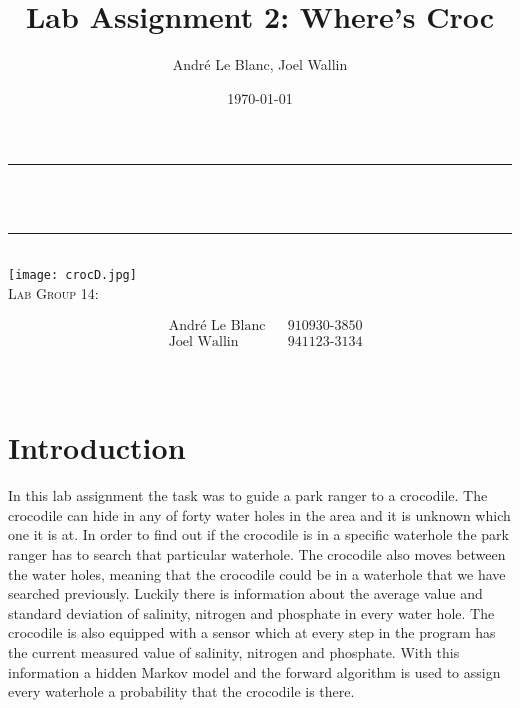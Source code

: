 \documentclass[12pt, a4paper]{article}
\title{Lab Assignment 2: Where’s Croc}	%
\author{André Le Blanc, Joel Wallin}
\date{\today}
\makeatletter
\let\thetitle\@title
\makeatother
\begin{document}
\begin{titlepage}
	\centering
    \vspace*{0.5 cm}
	\rule{\linewidth}{0.2 mm} \\[0.4 cm]
	{ \huge \bfseries \thetitle}\\  
	\rule{\linewidth}{0.2 mm} \\[1.5 cm]
    \texttt{[image: crocD.jpg]}\\[0.5 cm]
    
    \textsc{\Large Lab Group 14:}\\[0.5 cm]
	\begin{minipage}{0.4\textwidth}  
    \begin{align*}
	&\text{André Le Blanc}    &&\text{910930-3850}\\
	&\text{Joel Wallin}  &&\text{941123-3134}\\
	\end{align*}
	\end{minipage}\\[2 cm]
\end{titlepage}


\newpage
\tableofcontents
\newpage

\section{Introduction}

In this lab assignment the task was to guide a park ranger to a crocodile. The crocodile can hide in any of forty water holes in the area and it is unknown which one it is at. In order to find out if the crocodile is in a specific waterhole the park ranger has to search that particular waterhole. The crocodile also moves between the water holes, meaning that the crocodile could be in a waterhole that we have searched previously. Luckily there is information about the average value and standard deviation of salinity, nitrogen and phosphate in every water hole. The crocodile is also equipped with a sensor which at every step in the program has the current measured value of salinity, nitrogen and phosphate. With this information a hidden Markov model and the forward algorithm is used to assign every waterhole a probability that the crocodile is there.
\end{document}
